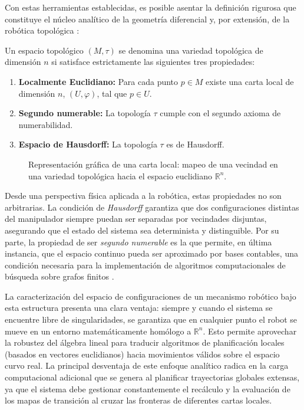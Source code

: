 Con estas herramientas establecidas, es posible asentar la definición rigurosa que constituye el 
núcleo analítico de la geometría diferencial y, por extensión, de la robótica topológica \parencite{waldmann2014topology}:

\begin{definition}
Un espacio topológico $(M, \tau)$ se denomina una variedad topológica de dimensión $n$ 
si satisface estrictamente las siguientes tres propiedades:
\begin{enumerate}
    \item \textbf{Localmente Euclidiano:} Para cada punto $p \in M$ existe una carta local de 
    dimensión $n$, $(U, \varphi)$, tal que $p \in U$.
    \item \textbf{Segundo numerable:} La topología $\tau$ cumple con el segundo 
    axioma de numerabilidad.
    \item \textbf{Espacio de Hausdorff:} La topología $\tau$ es de Hausdorff.
\end{enumerate}
\end{definition}

\begin{figure}[htbp]
    \centering
    

    \caption{Representación gráfica de una carta local: mapeo de una vecindad en una variedad topológica hacia el espacio euclidiano $\mathbb{R}^n$.}
    \label{fig:carta_local_variedad}
\end{figure}

Desde una perspectiva física aplicada a la robótica, estas propiedades no son arbitrarias. 
La condición de \textit{Hausdorff} \parencite{antonyan2016topologia} garantiza que dos configuraciones distintas del manipulador 
siempre puedan ser separadas por vecindades disjuntas, asegurando que el estado del sistema sea 
determinista y distinguible. Por su parte, la propiedad de ser \textit{segundo numerable} es 
la que permite, en última instancia, que el espacio continuo pueda ser aproximado por bases 
contables, una condición necesaria para la implementación de algoritmos computacionales de 
búsqueda sobre grafos finitos \parencite{farber2008}.

La caracterización del espacio de configuraciones de un mecanismo robótico bajo esta estructura 
presenta una clara ventaja: siempre y cuando el sistema se encuentre libre de singularidades, 
se garantiza que en cualquier punto el robot se mueve en un entorno matemáticamente homólogo 
a $\mathbb{R}^n$. Esto permite aprovechar la robustez del álgebra lineal para traducir 
algoritmos de planificación locales (basados en vectores euclidianos) hacia movimientos 
válidos sobre el espacio curvo real. La principal desventaja de este enfoque analítico radica 
en la carga computacional adicional que se genera al planificar trayectorias globales extensas, 
ya que el sistema debe gestionar constantemente el recálculo y la evaluación de los mapas de 
transición al cruzar las fronteras de diferentes cartas locales.

